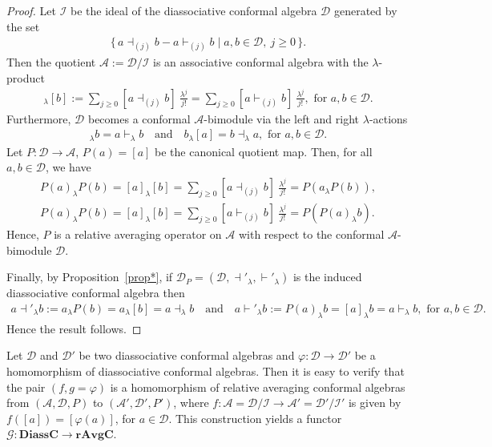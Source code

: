 \documentclass[a4paper,reqno,10pt]{amsart}
\theoremstyle{plain}
\theoremstyle{definition}
\theoremstyle{remark}
\newcommand{\D}{\mathcal{D}}
\newcommand{\la}{\lambda}
\begin{document}
\begin{proof}
Let $\mathcal{I}$ be the ideal of the diassociative conformal algebra $\mathcal{D}$ generated by the set
\begin{align*}
\{\,a\dashv_{(j)}b-a\vdash_{(j)}b
\mid a,b\in \mathcal{D}, ~ \! j\ge0\,\}.
\end{align*}
Then the quotient $\mathcal{A}:=\mathcal{D}/\mathcal{I}$ is an associative conformal algebra with the $\la$-product
\begin{align*}
[a]_{\la}[b]
:=
\sum_{j\ge0}[a\dashv_{(j)}b] ~ \! \frac{\la^j}{j!}
=
\sum_{j\ge0}[a\vdash_{(j)}b] ~ \!\frac{\la^j}{j!}, \text{ for } a, b \in \mathcal{D}.
\end{align*}
Furthermore, $\mathcal{D}$ becomes a conformal $\mathcal{A}$-bimodule via the left and right $\la$-actions
\begin{align*}
[a]_{\la}b=a\vdash_{\la}b
~~~ \text{ and } ~~~
b_{\la}[a]=b\dashv_{\la}a,  \text{ for } a, b \in \mathcal{D}.
\end{align*}
Let $P:\mathcal{D} \rightarrow \mathcal{A}$, $P(a)=[a]$
be the canonical quotient map. Then, for all $a,b\in\mathcal{D}$, we have
\begin{align*}
P(a)_{\la}P(b)
=[a]_{\la}[b] 
=\sum_{j\ge0}[a\dashv_{(j)}b] ~ \! \frac{\la^j}{j!}
=P(a_{\la}P(b)),\\
P(a)_{\la}P(b)
=[a]_{\la}[b] 
=\sum_{j\ge0}[a\vdash_{(j)}b] ~ \! \frac{\la^j}{j!}
=P(P(a)_{\la}b).
\end{align*}
Hence, $P$ is a relative averaging operator on $\mathcal{A}$ with respect to the conformal $\mathcal{A}$-bimodule $\D$.

Finally, by Proposition~\ref{prop*}, if $\D_P = (\D, \dashv'_\la, \vdash'_\la)$ is the induced diassociative conformal algebra then
\begin{align*}
a\dashv'_{\la}b :=a_{\la}P(b) = a_\la [b] = a \dashv_\la b ~~~ \text{ and }
~~~ a\vdash'_{\la}b := P(a)_{\la}b = [a]_\la b = a \vdash_\la b, \text{ for } a, b \in \D.
\end{align*}
Hence the result follows.
\end{proof}

Let $\mathcal{D}$ and
$\mathcal{D}'$
be two diassociative conformal algebras and $ \varphi:\mathcal{D} \rightarrow \mathcal{D}'$
be a homomorphism of diassociative conformal algebras. Then it is easy to verify that the pair $(f,g = \varphi)$ is a homomorphism of relative averaging conformal algebras from
$(\mathcal{A},\mathcal{D},P)$ to $(\mathcal{A}',\mathcal{D}',P')$, where $f:\mathcal{A}=\mathcal{D}/\mathcal{I} \rightarrow \mathcal{A}'=\mathcal{D}'/\mathcal{I}'$ is given by $f([a])=[ \varphi(a)]$, for $a \in \mathcal{D}$. This construction yields a functor $\mathcal{G}:\mathbf{DiassC} \rightarrow\mathbf{rAvgC}$.
\end{document}
